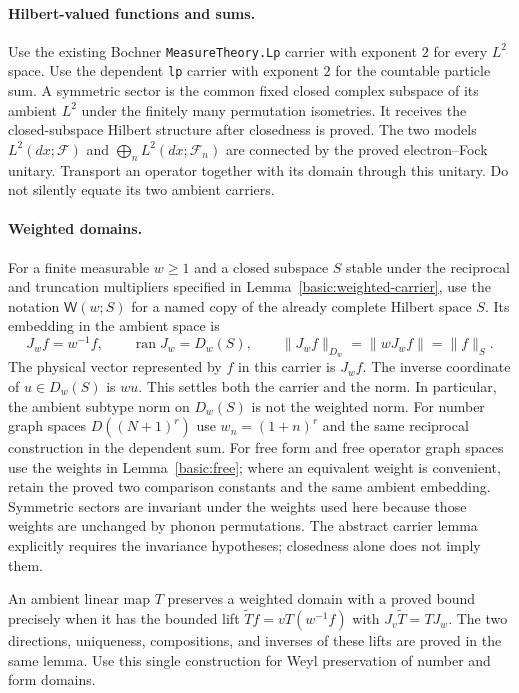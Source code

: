 \documentclass[11pt,a4paper]{article}
\theoremstyle{definition}
\theoremstyle{remark}
\begin{document}
\paragraph{Hilbert-valued functions and sums.}
Use the existing Bochner \nolinkurl{MeasureTheory.Lp} carrier with
exponent $2$ for every $L^2$ space. Use the dependent \nolinkurl{lp}
carrier with exponent $2$ for the countable particle sum. A symmetric
sector is the common fixed closed complex subspace of its ambient
$L^2$ under the finitely many permutation isometries. It receives
the closed-subspace Hilbert structure after closedness is proved.
The two models $L^2(dx;\mathcal F)$ and
$\bigoplus_n L^2(dx;\mathcal F_n)$ are connected by the proved
electron--Fock unitary. Transport an operator together with its domain
through this unitary. Do not silently equate its two ambient carriers.

\paragraph{Weighted domains.}
For a finite measurable $w\geq1$ and a closed subspace $S$ stable
under the reciprocal and truncation multipliers specified in
Lemma~\ref{basic:weighted-carrier}, use the notation
$\mathsf W(w;S)$ for a named copy of the already complete Hilbert
space $S$. Its embedding in the ambient space is
\[
 J_w f=w^{-1}f,\qquad
 \operatorname{ran}J_w=D_w(S),\qquad
 \|J_wf\|_{D_w}=\|wJ_wf\|=\|f\|_S.
\]
The physical vector represented by $f$ in this carrier is $J_wf$.
The inverse coordinate of $u\in D_w(S)$ is $wu$.
This settles both the carrier and the norm. In particular, the
ambient subtype norm on $D_w(S)$ is not the weighted norm.
For number graph spaces $D((N+1)^r)$ use $w_n=(1+n)^r$ and the same
reciprocal construction in the dependent sum. For free form and
free operator graph spaces use the weights in
Lemma~\ref{basic:free}; where an equivalent weight is convenient,
retain the proved two comparison constants and the same ambient
embedding. Symmetric sectors are invariant under the weights used
here because those weights are unchanged by phonon permutations.
The abstract carrier lemma explicitly requires the invariance
hypotheses; closedness alone does not imply them.

An ambient linear map $T$ preserves a weighted domain with a proved
bound precisely when it has the bounded lift
$\widetilde T f=vT(w^{-1}f)$ with
$J_v\widetilde T=TJ_w$. The two directions, uniqueness, compositions,
and inverses of these lifts are proved in the same lemma. Use this
single construction for Weyl preservation of number and form domains.
\end{document}
